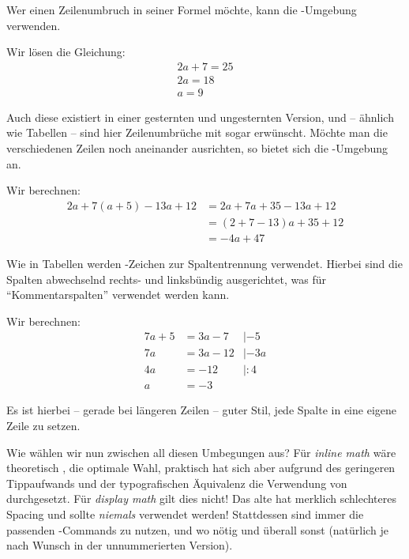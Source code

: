 Wer einen Zeilenumbruch in seiner Formel möchte, kann die -Umgebung verwenden.
\begin{latexlisting}
	Wir lösen die Gleichung:
	\begin{gather*}
		2a + 7 = 25 \\
		2a = 18\\
		a = 9
	\end{gather*}
\end{latexlisting}
Auch diese existiert in einer gesternten und ungesternten Version, und -- ähnlich wie Tabellen -- sind hier Zeilenumbrüche mit \latexcommand{\textbackslash} sogar erwünscht.
Möchte man die verschiedenen Zeilen noch aneinander ausrichten, so bietet sich die -Umgebung an.
\begin{latexlisting}
	Wir berechnen:
	\begin{align*}
		2a + 7(a + 5) - 13a + 12
		&= 2a + 7a + 35 - 13a + 12 \\
		&= (2 + 7 - 13)a + 35 + 12 \\
		&= -4a + 47
	\end{align*}
\end{latexlisting}
Wie in Tabellen werden \key{\&}-Zeichen zur Spaltentrennung verwendet.
Hierbei sind die Spalten abwechselnd rechts- und linksbündig ausgerichtet, was für \enquote{Kommentarspalten} verwendet werden kann.
\begin{latexlisting}
	Wir berechnen:
	\begin{align*}
		7a + 5
		&= 3a - 7
		&| -5 \\
		7a 
		&= 3a - 12
		&| -3a \\
		4a
		&= -12
		&| :4 \\
		a
		&= -3
	\end{align*}
\end{latexlisting}
Es ist hierbei -- gerade bei längeren Zeilen -- guter Stil, jede Spalte in eine eigene Zeile zu setzen.

Wie wählen wir nun zwischen all diesen Umbegungen aus?
Für \emph{inline math} wäre theoretisch \latexcommand{(}, \latexcommand{)} die optimale Wahl, praktisch hat sich aber aufgrund des geringeren Tippaufwands und der typografischen Äquivalenz die Verwendung von \key{\$} durchgesetzt.
Für \emph{display math} gilt dies nicht!
Das alte \key{\$\$} hat merklich schlechteres Spacing und sollte \emph{niemals} verwendet werden!
Stattdessen sind immer die passenden -Commands zu nutzen,  und  wo nötig und  überall sonst (natürlich je nach Wunsch in der unnummerierten Version).

